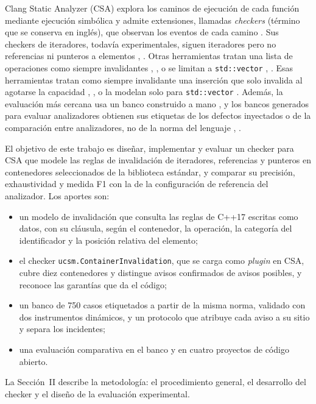 \documentclass[conference]{IEEEtran}
\newcommand{\code}[1]{\texttt{#1}}
\begin{document}
Clang Static Analyzer (CSA) explora los caminos de ejecución de cada función mediante ejecución simbólica \cite{king76} y admite extensiones, llamadas \textit{checkers} (término que se conserva en inglés), que observan los eventos de cada camino \cite{csadev}. Sus checkers de iteradores, todavía experimentales, siguen iteradores pero no referencias ni punteros a elementos \cite{csadoc}, \cite{balogh18}. Otras herramientas tratan una lista de operaciones como siempre invalidantes \cite{saxena26}, \cite{infer}, \cite{cppcheck} o se limitan a \code{std::vector} \cite{infer}, \cite{liu25}. Esas herramientas tratan como siempre invalidante una inserción que solo invalida al agotarse la capacidad \cite{saxena26}, \cite{infer}, \cite{cppcheck} o la modelan solo para \code{std::vector} \cite{liu25}. Además, la evaluación más cercana usa un banco construido a mano \cite{liu25}, y los bancos generados para evaluar analizadores obtienen sus etiquetas de los defectos inyectados o de la comparación entre analizadores, no de la norma del lenguaje \cite{kashyap19}, \cite{klinger19}.

El objetivo de este trabajo es diseñar, implementar y evaluar un checker para CSA que modele las reglas de invalidación de iteradores, referencias y punteros en contenedores seleccionados de la biblioteca estándar, y comparar su precisión, exhaustividad y medida F1 con la de la configuración de referencia del analizador. Los aportes son:
\begin{itemize}
\item un modelo de invalidación que consulta las reglas de C++17 escritas como datos, con su cláusula, según el contenedor, la operación, la categoría del identificador y la posición relativa del elemento;
\item el checker \code{ucsm.ContainerInvalidation}, que se carga como \textit{plugin} en CSA, cubre diez contenedores y distingue avisos confirmados de avisos posibles, y reconoce las garantías que da el código;
\item un banco de 750 casos etiquetados a partir de la misma norma, validado con dos instrumentos dinámicos, y un protocolo que atribuye cada aviso a su sitio y separa los incidentes;
\item una evaluación comparativa en el banco y en cuatro proyectos de código abierto.
\end{itemize}

La Sección~II describe la metodología: el procedimiento general, el desarrollo del checker y el diseño de la evaluación experimental.
\end{document}
